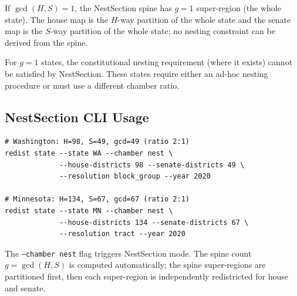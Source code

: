 \begin{proposition}[Spine triviality when $g=1$]
  If $\gcd(H, S) = 1$, the NestSection spine has $g = 1$ super-region
  (the whole state). The house map is the $H$-way partition of the whole state
  and the senate map is the $S$-way partition of the whole state; no nesting
  constraint can be derived from the spine.
\end{proposition}

For $g = 1$ states, the constitutional nesting requirement (where it exists)
cannot be satisfied by NestSection. These states require either an ad-hoc
nesting procedure or must use a different chamber ratio.

\subsection{NestSection CLI Usage}
\label{sec:nestsection:cli}

\begin{verbatim}
# Washington: H=98, S=49, gcd=49 (ratio 2:1)
redist state --state WA --chamber nest \
             --house-districts 98 --senate-districts 49 \
             --resolution block_group --year 2020

# Minnesota: H=134, S=67, gcd=67 (ratio 2:1)
redist state --state MN --chamber nest \
             --house-districts 134 --senate-districts 67 \
             --resolution tract --year 2020
\end{verbatim}

The \texttt{--chamber nest} flag triggers NestSection mode. The spine count
$g = \gcd(H, S)$ is computed automatically; the spine super-regions are
partitioned first, then each super-region is independently redistricted for
house and senate.
